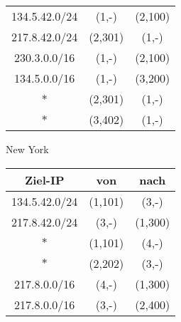 \documentclass{article}
\begin{document}
\begin{enumerate}[label=(\alph*)]
\begin{minipage}[t]{0.45\textwidth}
\begin{center}
\begin{tabular}{c|c|c}
					\hline
					134.5.42.0/24 & (1,-) & (2,100) \\
					217.8.42.0/24 & (2,301) & (1,-) \\
					230.3.0.0/16 & (1,-)  & (2,100) \\
					134.5.0.0/16 & (1,-) & (3,200) \\
					$\ast$ & (2,301) & (1,-) \\
					$\ast$ & (3,402) & (1,-)
				\end{tabular}
			\end{center}
		\end{minipage}
		\begin{minipage}[t]{0.45\textwidth}
			\begin{center}
				New York \\
				\begin{tabular}{c|c|c}
					\textbf{Ziel-IP} & \textbf{von} & \textbf{nach} \\
					\hline
					134.5.42.0/24 & (1,101) & (3,-) \\
					217.8.42.0/24 & (3,-) & (1,300) \\
					$\ast$ & (1,101)  & (4,-) \\
					$\ast$ & (2,202) & (3,-) \\
					217.8.0.0/16 & (4,-) & (1,300) \\
					217.8.0.0/16 & (3,-) & (2,400)
				\end{tabular}
			\end{center}
		\end{minipage}
	\end{enumerate}
	
\end{document}
